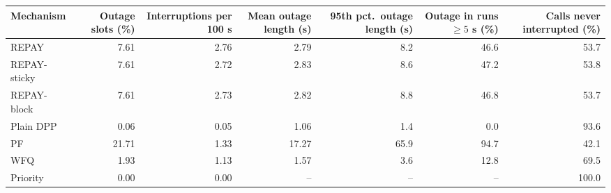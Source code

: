 \begin{tabular}{lrrrrrr}
\toprule
Mechanism & Outage slots (\%) & Interruptions per 100 s & Mean outage length (s) & 95th pct.\ outage length (s) & Outage in runs $\geq 5$ s (\%) & Calls never interrupted (\%) \\
\midrule
REPAY & 7.61 & 2.76 & 2.79 & 8.2 & 46.6 & 53.7 \\
REPAY-sticky & 7.61 & 2.72 & 2.83 & 8.6 & 47.2 & 53.8 \\
REPAY-block & 7.61 & 2.73 & 2.82 & 8.8 & 46.8 & 53.7 \\
Plain DPP & 0.06 & 0.05 & 1.06 & 1.4 & 0.0 & 93.6 \\
PF & 21.71 & 1.33 & 17.27 & 65.9 & 94.7 & 42.1 \\
WFQ & 1.93 & 1.13 & 1.57 & 3.6 & 12.8 & 69.5 \\
Priority & 0.00 & 0.00 & -- & -- & -- & 100.0 \\
\bottomrule
\end{tabular}
